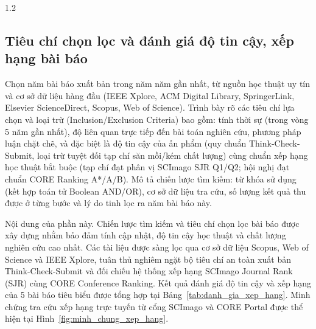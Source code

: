 \begin{spacing}{1.2}
\subsection{Tiêu chí chọn lọc và đánh giá độ tin cậy, xếp hạng bài báo}
\label{subsec:tieu_chi_chon_bai}

\begin{huongdan}
Chọn năm bài báo xuất bản trong năm năm gần nhất, từ nguồn học thuật uy tín và cơ sở dữ liệu hàng đầu (IEEE Xplore, ACM Digital Library, SpringerLink, Elsevier ScienceDirect, Scopus, Web of Science). Trình bày rõ các tiêu chí lựa chọn và loại trừ (Inclusion/Exclusion Criteria) bao gồm: tính thời sự (trong vòng 5 năm gần nhất), độ liên quan trực tiếp đến bài toán nghiên cứu, phương pháp luận chặt chẽ, và đặc biệt là độ tin cậy của ấn phẩm (quy chuẩn Think-Check-Submit, loại trừ tuyệt đối tạp chí săn mồi/kém chất lượng) cùng chuẩn xếp hạng học thuật bắt buộc (tạp chí đạt phân vị SCImago SJR Q1/Q2; hội nghị đạt chuẩn CORE Ranking A*/A/B). Mô tả chiến lược tìm kiếm: từ khóa sử dụng (kết hợp toán tử Boolean AND/OR), cơ sở dữ liệu tra cứu, số lượng kết quả thu được ở từng bước và lý do tinh lọc ra năm bài báo này.
\end{huongdan}

Nội dung của phần này. Chiến lược tìm kiếm và tiêu chí chọn lọc bài báo được xây dựng nhằm bảo đảm tính cập nhật, độ tin cậy học thuật và chất lượng nghiên cứu cao nhất. Các tài liệu được sàng lọc qua cơ sở dữ liệu Scopus, Web of Science và IEEE Xplore, tuân thủ nghiêm ngặt bộ tiêu chí an toàn xuất bản Think-Check-Submit và đối chiếu hệ thống xếp hạng SCImago Journal Rank (SJR) cùng CORE Conference Ranking. Kết quả đánh giá độ tin cậy và xếp hạng của 5 bài báo tiêu biểu được tổng hợp tại Bảng~\ref{tab:danh_gia_xep_hang}. Minh chứng tra cứu xếp hạng trực tuyến từ cổng SCImago và CORE Portal được thể hiện tại Hình~\ref{fig:minh_chung_xep_hang}.


\end{spacing}
